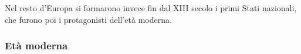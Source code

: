 % 

Nel resto d'Europa si formarono invece fin dal XIII secolo i primi 
Stati nazionali, che furono poi i protagonisti dell'età 
moderna.

\subsubsection{Età moderna}


